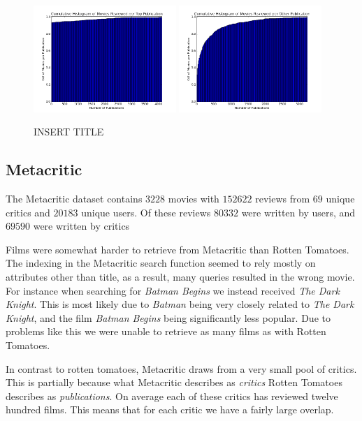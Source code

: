 \documentclass[12pt]{article}
\begin{document}
	 \begin{figure}[H]
	    \centering
	    \includegraphics[width=0.48\textwidth]{plots/plot_r_pub_top.png}
	    \includegraphics[width=0.48\textwidth]{plots/plot_r_pub_oth.png}
	    \caption{INSERT TITLE}
	    \label{fig:r_pub}
	\end{figure}

\subsection{Metacritic}

	The Metacritic dataset contains $3228$ movies with $152622$ reviews from $69$ unique critics and $20183$ unique users. Of these reviews $80332$ were written by users, and $69590$ were written by critics


	Films were somewhat harder to retrieve from Metacritic than Rotten Tomatoes. The indexing in the Metacritic search function seemed to rely mostly on attributes other than title, as a result, many queries resulted in the wrong movie. For instance when searching for \textit{Batman Begins} we instead received \textit{The Dark Knight}. This is most likely due to \textit{Batman} being very closely related to \textit{The Dark Knight}, and the film \textit{Batman Begins} being significantly less popular. Due to problems like this we were unable to retrieve as many films as with Rotten Tomatoes.

	In contrast to rotten tomatoes, Metacritic draws from a very small pool of critics. This is partially because what Metacritic describes as \textit{critics} Rotten Tomatoes describes as \textit{publications}. On average each of these critics has reviewed twelve hundred films. This means that for each critic we have a fairly large overlap.
\end{document}

